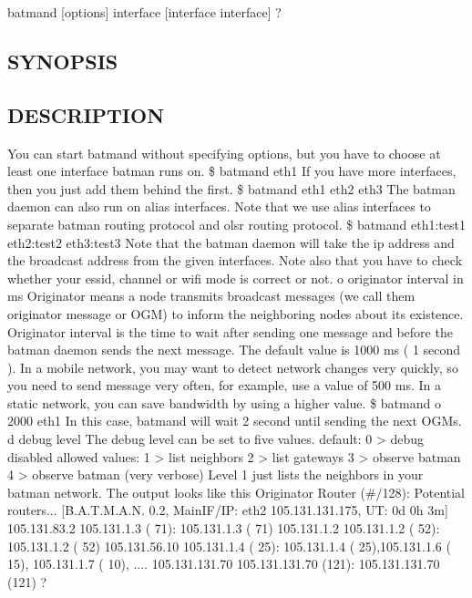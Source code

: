 \documentclass[
	12pt,
	a4paper,
	twoside,
	english,
	headsepline,
	footnosepline,
	automark,
	normalheadings,
	openany,
	cleardoubleplain,
	abstracton,
	idxtotoc,
	liststotoc,
	bibtotoc,
 	BCOR8mm,
]{scrartcl}
\begin{document}
batmand [options] interface [interface interface]
?

\subsection{SYNOPSIS}

\subsection{DESCRIPTION}
You can start batmand without specifying options, but you have to choose at least one  interface batman runs on. \$ batmand eth1 If you have more interfaces, then you just add them behind the first. \$ batmand eth1 eth2 eth3 The batman daemon can also run on alias interfaces. Note that we use alias interfaces to separate batman routing protocol and olsr routing  protocol. \$ batmand eth1:test1 eth2:test2 eth3:test3 Note that the batman daemon will take the ip address and the broadcast address from the  given interfaces. Note also that you have to check whether your essid, channel or wifi mode is correct or not.
 o originator interval in ms Originator means a node transmits broadcast messages (we call them originator message or  OGM) to inform the neighboring nodes about its existence. Originator interval is the time to wait after sending one message and before the batman  daemon sends the next message. The default value is 1000 ms ( 1 second ). In a mobile network, you may want to detect network changes very quickly, so you need to  send message very often, for example, use a value of 500 ms. In a static network, you can save bandwidth by using a higher value. \$ batmand  o 2000 eth1 In this case, batmand will wait 2 second until sending the next OGMs.  d debug level The debug level can be set to five values.           default:   0  > debug disabled           allowed values:   1  > list neighbors                               2  > list gateways                               3  > observe batman                               4  > observe batman (very verbose) Level 1 just lists the neighbors in your batman network. The output looks like this Originator           Router (\#/128):    Potential routers... [B.A.T.M.A.N. 0.2, MainIF/IP:   eth2 105.131.131.175, UT: 0d 0h 3m] 105.131.83.2        105.131.1.3 (  71):     105.131.1.3 (  71) 105.131.1.2         105.131.1.2 (  52):     105.131.1.2 (  52) 105.131.56.10     105.131.1.4 (  25):   105.131.1.4 (  25),105.131.1.6 ( 15), 105.131.1.7 ( 10),   .... 105.131.131.70   105.131.131.70 (121):  105.131.131.70 (121)
?
\end{document}
